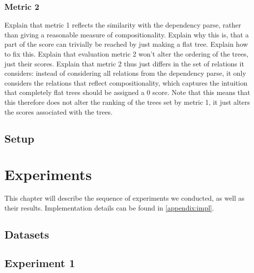 \documentclass{report}
\theoremstyle{definition}
\theoremstyle{plain}
\begin{document}
\subsection{Metric 2}

Explain that metric 1 reflects the similarity with the dependency parse, rather than giving a reasonable measure of compositionality. Explain why this is, that a part of the score can trivially be reached by just making a flat tree. Explain how to fix this. Explain that evaluation metric 2 won't alter the ordering of the trees, just their scores.
Explain that metric 2 thus just differs in the set of relations it considers: instead of considering all relations from the dependency parse, it only considers the relations that reflect compositionality, which captures the intuition that completely flat trees should be assigned a 0 score. Note that this means that this therefore does not alter the ranking of the trees set by metric 1, it just alters the scores associated with the trees.





\section{Setup}







%
%


\chapter{Experiments}

This chapter will describe the sequence of experiments we conducted, as well as their results. Implementation details can be found in \ref{appendix:impl}. 

\section{Datasets}

\section{Experiment 1}
\end{document}
